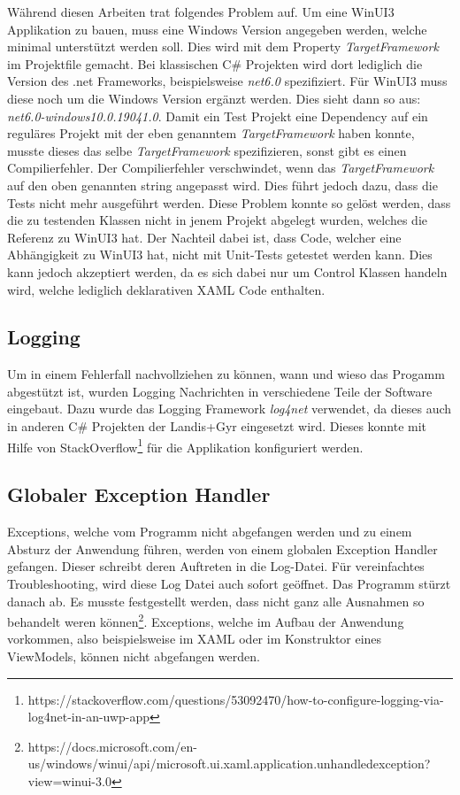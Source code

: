 Während diesen Arbeiten trat folgendes Problem auf.
Um eine WinUI3 Applikation zu bauen, muss eine Windows Version angegeben werden, welche minimal unterstützt werden soll.
Dies wird mit dem Property \textit{TargetFramework} im Projektfile gemacht.
Bei klassischen C\# Projekten wird dort lediglich die Version des .net Frameworks, beispielsweise \textit{net6.0} spezifiziert.
Für WinUI3 muss diese noch um die Windows Version ergänzt werden.
Dies sieht dann so aus: \textit{net6.0-windows10.0.19041.0}.
Damit ein Test Projekt eine Dependency auf ein reguläres Projekt mit der eben genanntem \textit{TargetFramework} haben konnte, musste dieses das selbe \textit{TargetFramework} spezifizieren, sonst gibt es einen Compilierfehler.
Der Compilierfehler verschwindet, wenn das \textit{TargetFramework} auf den oben genannten string angepasst wird.
Dies führt jedoch dazu, dass die Tests nicht mehr ausgeführt werden.
Diese Problem konnte so gelöst werden, dass die zu testenden Klassen nicht in jenem Projekt abgelegt wurden, welches die Referenz zu WinUI3 hat.
Der Nachteil dabei ist, dass Code, welcher eine Abhängigkeit zu WinUI3 hat, nicht mit Unit-Tests getestet werden kann.
Dies kann jedoch akzeptiert werden, da es sich dabei nur um Control Klassen handeln wird, welche lediglich deklarativen XAML Code enthalten.

\subsection{Logging}
Um in einem Fehlerfall nachvollziehen zu können, wann und wieso das Progamm abgestützt ist, wurden Logging Nachrichten in verschiedene Teile der Software eingebaut.
Dazu wurde das Logging Framework \textit{log4net} verwendet, da dieses auch in anderen C\# Projekten der Landis+Gyr eingesetzt wird.
Dieses konnte mit Hilfe von StackOverflow\footnote{https://stackoverflow.com/questions/53092470/how-to-configure-logging-via-log4net-in-an-uwp-app} für die Applikation konfiguriert werden.

\subsection{Globaler Exception Handler}
Exceptions, welche vom Programm nicht abgefangen werden und zu einem Absturz der Anwendung führen, werden von einem globalen Exception Handler gefangen.
Dieser schreibt deren Auftreten in die Log-Datei. 
Für vereinfachtes Troubleshooting, wird diese Log Datei auch sofort geöffnet.
Das Programm stürzt danach ab.
Es musste festgestellt werden, dass nicht ganz alle Ausnahmen so behandelt weren können\footnote{https://docs.microsoft.com/en-us/windows/winui/api/microsoft.ui.xaml.application.unhandledexception?view=winui-3.0}.
Exceptions, welche im Aufbau der Anwendung vorkommen, also beispielsweise im XAML oder im Konstruktor eines ViewModels, können nicht abgefangen werden.


\pagebreak

